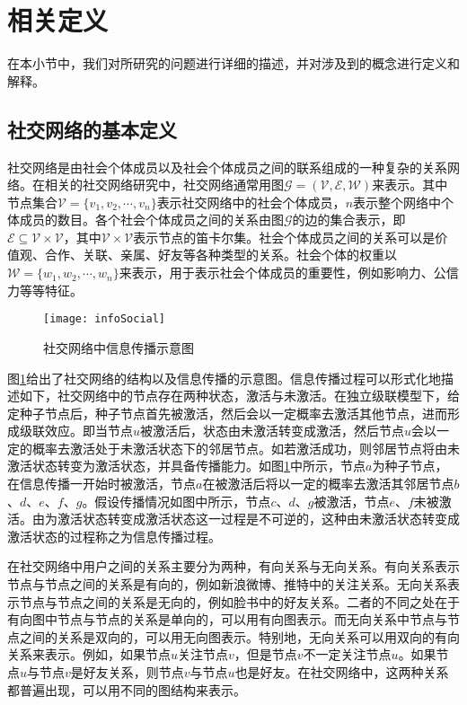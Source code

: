\section{相关定义}
\label{sec5:definition}
在本小节中，我们对所研究的问题进行详细的描述，并对涉及到的概念进行定义和解释。
\subsection{社交网络的基本定义}
\label{subsec5:socialNetwork}
社交网络是由社会个体成员以及社会个体成员之间的联系组成的一种复杂的关系网络。在相关的社交网络研究中，社交网络通常用图$\mathcal{G}=\left(\mathcal{V},\mathcal{E},\mathcal{W}\right)$来表示。其中节点集合$\mathcal{V}=\{v_1,v_2,\cdots,v_n\}$表示社交网络中的社会个体成员，$n$表示整个网络中个体成员的数目。各个社会个体成员之间的关系由图$\mathcal{G}$的边的集合表示，即$\mathcal{E} \subseteq \mathcal{V} \times \mathcal{V}$，其中$\mathcal{V} \times \mathcal{V}$表示节点的笛卡尔集。社会个体成员之间的关系可以是价值观、合作、关联、亲属、好友等各种类型的关系。社会个体的权重以$\mathcal{W}=\{w_1,w_2,\cdots,w_n\}$来表示，用于表示社会个体成员的重要性，例如影响力、公信力等等特征。

\begin{figure}[!ht]
    \centering
    \texttt{[image: infoSocial]}
    \caption{社交网络中信息传播示意图}
    \label{fig:infoSocial}
\end{figure}

图\ref{fig:infoSocial}给出了社交网络的结构以及信息传播的示意图。信息传播过程可以形式化地描述如下，社交网络中的节点存在两种状态，激活与未激活。在独立级联模型下，给定种子节点后，种子节点首先被激活，然后会以一定概率去激活其他节点，进而形成级联效应。即当节点$u$被激活后，状态由未激活转变成激活，然后节点$u$会以一定的概率去激活处于未激活状态下的邻居节点。如若激活成功，则邻居节点将由未激活状态转变为激活状态，并具备传播能力。如图\ref{fig:infoSocial}中所示，节点$a$为种子节点，在信息传播一开始时被激活，节点$a$在被激活后将以一定的概率去激活其邻居节点$b$、$d$、$e$、$f$、$g$。假设传播情况如图中所示，节点$c$、$d$、$g$被激活，节点$e$、$f$未被激活。由为激活状态转变成激活状态这一过程是不可逆的，这种由未激活状态转变成激活状态的过程称之为信息传播过程。

在社交网络中用户之间的关系主要分为两种，有向关系与无向关系。有向关系表示节点与节点之间的关系是有向的，例如新浪微博、推特中的关注关系。无向关系表示节点与节点之间的关系是无向的，例如脸书中的好友关系。二者的不同之处在于有向图中节点与节点的关系是单向的，可以用有向图表示。而无向关系中节点与节点之间的关系是双向的，可以用无向图表示。特别地，无向关系可以用双向的有向关系来表示。例如，如果节点$u$关注节点$v$，但是节点$v$不一定关注节点$u$。如果节点$u$与节点$v$是好友关系，则节点$v$与节点$u$也是好友。在社交网络中，这两种关系都普遍出现，可以用不同的图结构来表示。

